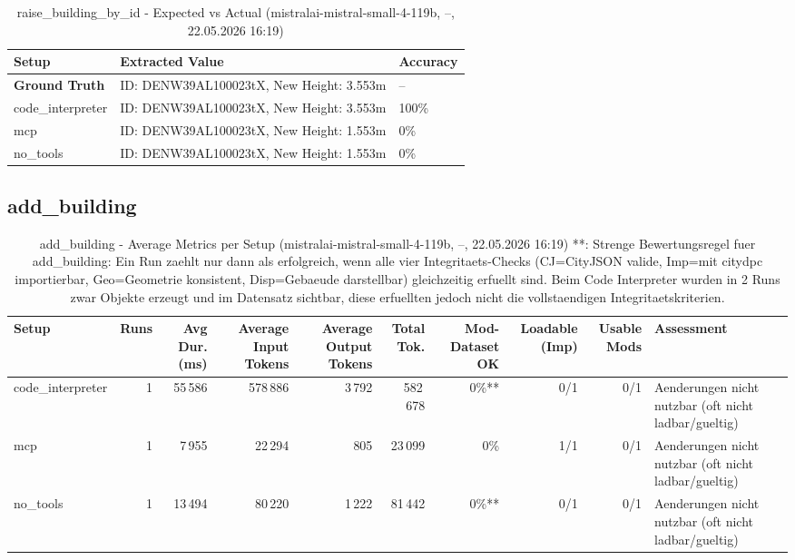 \documentclass[a4paper,11pt]{article}
\begin{document}
\begin{table}[H]
\centering
\scriptsize
\caption{raise\_building\_by\_id - Expected vs Actual (mistralai-mistral-small-4-119b, --, 22.05.2026 16:19)}
\begin{tabular}{l l l}
\toprule
Setup & Extracted Value & Accuracy \\
\midrule
\textbf{Ground Truth} & ID: DENW39AL100023tX, New Height: 3.553m & -- \\
\midrule
code\_interpreter & ID: DENW39AL100023tX, New Height: 3.553m & 100\% \\
mcp & ID: DENW39AL100023tX, New Height: 1.553m & 0\% \\
no\_tools & ID: DENW39AL100023tX, New Height: 1.553m & 0\% \\
\bottomrule
\end{tabular}
\end{table}

\clearpage

\subsection{add\_building}

\begin{table}[H]
\centering
\scriptsize
\caption{add\_building - Average Metrics per Setup (mistralai-mistral-small-4-119b, --, 22.05.2026 16:19) **: Strenge Bewertungsregel fuer add\_building: Ein Run zaehlt nur dann als erfolgreich, wenn alle vier Integritaets-Checks (CJ=CityJSON valide, Imp=mit citydpc importierbar, Geo=Geometrie konsistent, Disp=Gebaeude darstellbar) gleichzeitig erfuellt sind. Beim Code Interpreter wurden in 2 Runs zwar Objekte erzeugt und im Datensatz sichtbar, diese erfuellten jedoch nicht die vollstaendigen Integritaetskriterien.}
\label{tab:combined\_add\_building\_metrics\_20260522}
\begin{tabular}{l r r r r r r r r l}
\toprule
Setup & Runs & Avg Dur. (ms) & Average Input Tokens & Average Output Tokens & Total Tok. & Mod-Dataset OK & Loadable (Imp) & Usable Mods & Assessment \\
\midrule
code\_interpreter & 1 & 55\,586 & 578\,886 & 3\,792 & 582\,678 & 0\%** & 0/1 & 0/1 & Aenderungen nicht nutzbar (oft nicht ladbar/gueltig) \\
mcp & 1 & 7\,955 & 22\,294 & 805 & 23\,099 & 0\% & 1/1 & 0/1 & Aenderungen nicht nutzbar (oft nicht ladbar/gueltig) \\
no\_tools & 1 & 13\,494 & 80\,220 & 1\,222 & 81\,442 & 0\%** & 0/1 & 0/1 & Aenderungen nicht nutzbar (oft nicht ladbar/gueltig) \\
\bottomrule
\end{tabular}
\end{table}
\end{document}
